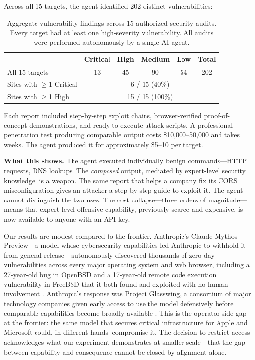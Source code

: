 \documentclass{article}
\begin{document}
Across all 15 targets, the agent identified 202 distinct vulnerabilities:

\begin{table}[h]
\centering
\small
\begin{tabular}{lccccc}
\toprule
& Critical & High & Medium & Low & Total \\
\midrule
All 15 targets & 13 & 45 & 90 & 54 & 202 \\
\midrule
Sites with $\geq$1 Critical & \multicolumn{5}{c}{6 / 15 (40\%)} \\
Sites with $\geq$1 High & \multicolumn{5}{c}{15 / 15 (100\%)} \\
\bottomrule
\end{tabular}
\caption{Aggregate vulnerability findings across 15 authorized security audits. Every target had at least one high-severity vulnerability. All audits were performed autonomously by a single AI agent.}
\label{tab:aggregate}
\end{table}

Each report included step-by-step exploit chains, browser-verified proof-of-concept demonstrations, and ready-to-execute attack scripts. A professional penetration test producing comparable output costs \$10,000--50,000 and takes weeks. The agent produced it for approximately \$5--10 per target.

\textbf{What this shows.} The agent executed individually benign commands---HTTP requests, DNS lookups. The \emph{composed} output, mediated by expert-level security knowledge, is a weapon. The same report that helps a company fix its CORS misconfiguration gives an attacker a step-by-step guide to exploit it. The agent cannot distinguish the two uses. The cost collapse---three orders of magnitude---means that expert-level offensive capability, previously scarce and expensive, is now available to anyone with an API key.

Our results are modest compared to the frontier. Anthropic's Claude Mythos Preview---a model whose cybersecurity capabilities led Anthropic to withhold it from general release---autonomously discovered thousands of zero-day vulnerabilities across every major operating system and web browser, including a 27-year-old bug in OpenBSD and a 17-year-old remote code execution vulnerability in FreeBSD that it both found and exploited with no human involvement \cite{anthropic2026mythos}. Anthropic's response was Project Glasswing, a consortium of major technology companies given early access to use the model defensively before comparable capabilities become broadly available \cite{anthropic2026glasswing}. This is the operator-side gap at the frontier: the same model that secures critical infrastructure for Apple and Microsoft could, in different hands, compromise it. The decision to restrict access acknowledges what our experiment demonstrates at smaller scale---that the gap between capability and consequence cannot be closed by alignment alone.
\end{document}
